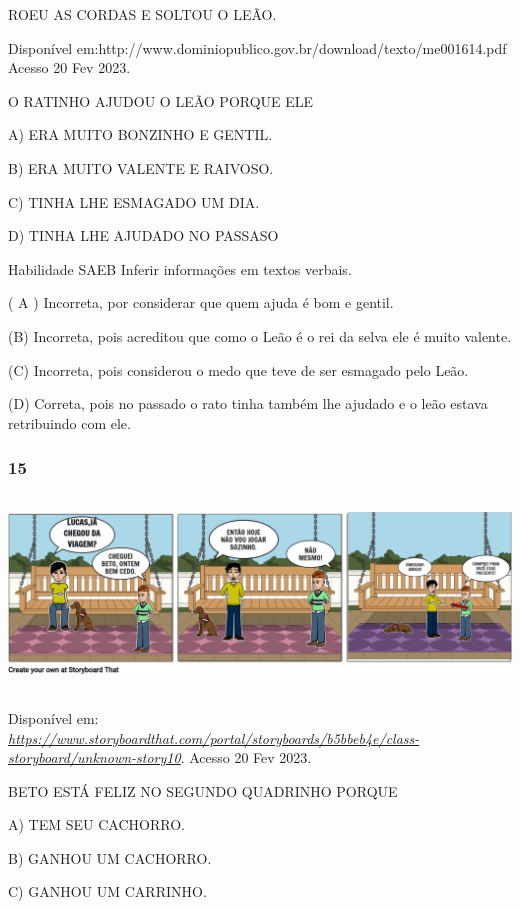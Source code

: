 \begin{escola}
ROEU AS CORDAS E SOLTOU O LEÃO.

Disponível
em:http://www.dominiopublico.gov.br/download/texto/me001614.pdf Acesso
20 Fev 2023.

O RATINHO AJUDOU O LEÃO PORQUE ELE

A) ERA MUITO BONZINHO E GENTIL.

B) ERA MUITO VALENTE E RAIVOSO.

C) TINHA LHE ESMAGADO UM DIA.

D) TINHA LHE AJUDADO NO PASSASO

Habilidade SAEB Inferir informações em textos verbais.

\protect\hypertarget{_heading=h.37m2jsg}{}{}( A ) Incorreta, por
considerar que quem ajuda é bom e gentil.

(B) Incorreta, pois acreditou que como o Leão é o rei da selva ele é
muito valente.

(C) Incorreta, pois considerou o medo que teve de ser esmagado pelo
Leão.

(D) Correta, pois no passado o rato tinha também lhe ajudado e o leão
estava retribuindo com ele.

\subsubsection{15}\label{section-55}

\includegraphics[width=6.13750in,height=2.02917in]{media/image221.png}

Disponível em:
\href{https://www.storyboardthat.com/portal/storyboards/b5bbeb4e/class-storyboard/unknown-story10}{\emph{https://www.storyboardthat.com/portal/storyboards/b5bbeb4e/class-storyboard/unknown-story10}}.
Acesso 20 Fev 2023.

BETO ESTÁ FELIZ NO SEGUNDO QUADRINHO PORQUE

A) TEM SEU CACHORRO.

B) GANHOU UM CACHORRO.

C) GANHOU UM CARRINHO.


\end{escola}
